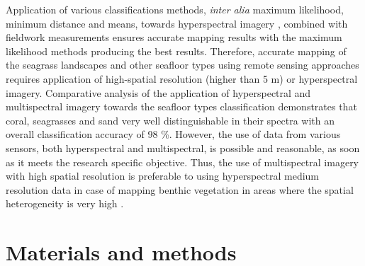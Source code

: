 \documentclass[11pt]{article}
\begin{document}
Application of various classifications methods, \textit{inter alia} maximum likelihood, minimum distance and means, towards
hyperspectral imagery \cite{Peneva08}\label{Peneva08}, combined with fieldwork measurements ensures accurate
mapping results with the maximum likelihood methods producing the best results. 
Therefore, accurate mapping of the seagrass landscapes and other seafloor types using remote sensing
approaches requires application of high-spatial resolution (higher than 5 m) or hyperspectral imagery.
Comparative analysis of the application of hyperspectral\label{sec:2.4.2} and multispectral imagery towards the
seafloor types classification \cite{Hochberg03a}\label{Hochberg03a} demonstrates that coral, seagrasses and
sand very well distinguishable in their spectra with an overall classification accuracy of 98 \%.
However, the use of data from various sensors, both hyperspectral and multispectral, is possible and
reasonable, as soon as it meets the research specific objective. 
Thus, the use of multispectral imagery
with high spatial resolution is preferable to using hyperspectral medium resolution data in case of
mapping benthic vegetation in areas where the spatial heterogeneity is very high \cite{Vahtmae07}\label{Vahtmae07}.

\section{Materials and methods}\label{sec:3}
\end{document}
